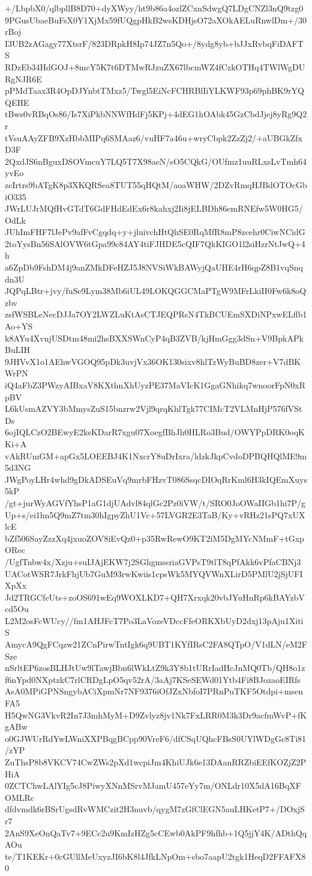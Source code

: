 +/LbpbX0/qlbpllB8D70+dyXWyy/ht9b86a4ozlZCxnSdwgQ7LDgCNZl3nQ9tzg0
9PGusUbaeBuFsX0Y1XjMx59fUQgpHkB2wsKDHjsO72aXOkAELuRnwlDm+/30rBoj
I3UB2zAGagy77XtsrF/823DRpkH8Ip74JZ7n5Qo+/8ydg8yb+bJJxRvbqFiDAFTS
RDzEb34HdGOJ+8mcY5K7t6DTMwRJzuZX67lbcmWZ4fCzkOTHq4TWlWgDURgNJR6E
pPMdTaax3R4OpDJYnbtTMxz5/Twgl5EiNcFCHRBlIiYLKWF93p69phBK9rYQQEHE
tBws0vRBqOs86/Is7XiPkbNNWfHdFj5KPj+4dEG1hOAbk45GzCbdJjej8yRg9Q2r
tVsuAAyZFB9XzHbbMIPq6SMAaz6/vuHF7a46u+wryCbpk2ZzZj2/+aUBGkZfxD3F
2QxdJS6nBguxDSOVmcuY7LQ5T7X98aeN/sO5CQkG/OUfmz1uuRLxsLvTmh64yvEo
zcIrtrs9bATgK8p3XKQRSea8TUT55qHQtM/aoaWHW/2DZvRmqHJBdOTOcGbiO335
JWrLUJrMQfHvGTdT6GdFHdEdEx6r8kahxj2Ii8jELBDh86emRNEfw5W0HG5/OdLk
JUhImFHF7lJePv9afFvCgqdq+y+jluivchHtQhSE0RqMfR8mP8zcehr0CiwNCidG
2toYysBn56SAlOVW6tGpa99c84AY4tiFJHDE5cQIF7QkKIGO1l2siHzrNtJwQ+4h
a6ZpDb9FshDM4j9anZMkDFeHZJ5J8NVSiWkBAWyjQaUHE4rH6qpZ8B1vqSnqdn3U
JQPqLBtr+jvy/fuSe9Lym38Mb6iUL49LOKQGGCMaPTgW9MFrLkiII0Fw6k8oQzbv
zsfWSBLeNecDJJa7OY2LWZLuKtAsCTJEQPRsN4TkBCUEmSXDiNPxwELflb1Ao+YS
k8AYu4XvnjUSDtm48mi2hsBXXSWnCyP4qB3ZVB/kjHmGgg3dSn+V9BpkAPkBuLIH
9JHVvX1o1AEhwVGOQ95pDk3uvjVx36OK130sixv8hlTzWyBuBD8zer+V7dBKWrPN
iQ4aFbZ3PWzyAIBxaV8KXthnXhUyzPE37MaVIcK1GgaGNhikq7wnoorFpN0xRpBV
L6kUsmAZVY3bMmysZuS15bnzrw2Vjl9qrqKhlTgk77CIMcT2VLMnHjP576fVStDs
6ojIQLCzO2BEwyE2ksKDarR7xgu07XoegfBhJh0HLRo3Bud/OWYPpDRK0oqKKi+A
vAkRUmGM+apGx5LOEEBJ4K1NxcrY8uDrIxra/ldzkJkpCvdoDPBQHQlME9m5d3NG
JWgPoyLHr4whd9gDkADSEuVq9mrbFHzvT086SsqcDIOqRrKml6H3kIQEmXuys5kP
/gt+jurWyAGVfYhsP1aG1djUAdvl84qlGc2Pz0iVW/t/SRO0JoOWaIIGb1hi7P/g
Up+s/ei1hn5Q9mZ7tm30hIgpyZhU1Vc+57LVGR2E3TaB/Ky+vRHz21sPQ7xUXlcE
bZf506SayZzzXq4jxuoZOV8iEvQz0+p35RwRewO9KT2iM5DgMYcNMmF+tGxpORec
/UgfTnbw4x/Xzju+suIJAjEKW7j2SGhgmssriaGVPsT9tlT8qPfAkk6vPfaCBNj3
UACotWSR7JrkFhjUb7GuM93rwKwiis1cpsWk5MYQVWnXLirD5PMlU2jSjUFIXpXx
Jd2TRGCfcUts+zoOS691wEq9WOXLKD7+QH7Xrxqk20vbJYuHnRp6kBAYzbVcd5Ou
L2M2osFcWUcy//fm1AHJFcT7Po3LaVozeVDccFfeORKXbUyD2dxj13pAju1XitiS
AmycA9QgFCqzw21ZCnPirwTntIgk6q9UBT1KYfIRsC2FA8QTpO/V1dLN/eM2FSze
nSrltEP6zosBLHJtUw9lTawjBbn6lWkLtZ9k3Y8b1tURrIadHcJnMQ0Tb/QH8o1z
f6nYpd0NXptzkC7rlCRDgLpO5qv52rA/3aAj7KSeSEWd01Ytb4Fi8BJozaoEIRfs
AsA0MPiGPNSngybACiXpmNr7NF9376iOfJZxNbfoI7PRnPuTKF5Otdpi+msenFA5
H5QwNG3VkvR2In7J3mhMyM+D9Zvlyz8jv1Nk7FxLRR0M3k3Dr9acfmWvP+fKgABw
o0GJWUrRdYwLWniXXPBqgBCpp90VreF6/dfCSqUQhcFBsS0UYlWDgGc8Ti81/zYP
ZuThsP8b8VKCV74CwZWs2pXd1wcpiJm4KhiUJk6e13DAanRRZbiEEfKOZjZ2PHiA
0ZCTChwLAlYIg5cJ8PiwyXNnMSrvMJamU457eYy7m/ONLdr10X5dA16BqXFOMLRc
dfdvmdk6rBSrUgsdRvWMCzit2H3nuvb/qygM7zGfClEGN5auLHKetP7+/DOxjSr7
2AnS9XeOnQaTv7+9ECc2u9KmIzHZg5cCEwb0AkPF9hfhb+1Q5jjY4K/ADthQqAOu
te/T1KEKr+0cGUllMeUxyzJI6bK8l4JfkLNpOm+sbo7aapU2tgk1HeqD2FFAFX80
